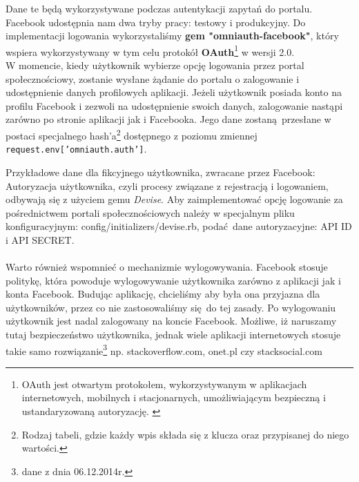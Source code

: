 Dane te będą wykorzystywane podczas autentykacji zapytań do portalu. Facebook udostępnia nam dwa tryby pracy: testowy i produkcyjny. Do implementacji logowania wykorzystaliśmy \textbf{gem "omniauth-facebook"}, który wspiera wykorzystywany w tym celu protokół \textbf{OAuth}\footnote{OAuth jest otwartym protokołem, wykorzystywanym w aplikacjach internetowych, mobilnych i stacjonarnych, umożliwiającym bezpieczną i ustandaryzowaną autoryzację. \cite{oauth}} w  wersji 2.0.
\\

W momencie, kiedy użytkownik wybierze opcję logowania przez portal społecznościowy, zostanie wysłane żądanie do portalu o zalogowanie i udostępnienie danych profilowych aplikacji. Jeżeli użytkownik posiada konto na profilu Facebook i zezwoli na udostępnienie swoich danych, zalogowanie nastąpi zarówno po stronie aplikacji jak i Facebooka. Jego dane zostaną przesłane w postaci specjalnego hash'a\footnote{Rodzaj tabeli, gdzie każdy wpis składa się z klucza oraz przypisanej do niego wartości.} dostępnego z poziomu zmiennej \texttt{request.env['omniauth.auth']}.

\clearpage

Przykładowe dane dla fikcyjnego użytkownika, zwracane przez Facebook:\\


\clearpage
Autoryzacja użytkownika, czyli procesy związane z rejestracją i logowaniem, odbywają się z użyciem gemu \emph{Devise}. Aby zaimplementować opcję logowanie za pośrednictwem portali społecznościowych należy w specjalnym pliku konfiguracyjnym: config/initializers/devise.rb, podać dane autoryzacyjne: API ID i API SECRET.\\

 \\

Warto również wspomnieć o mechanizmie wylogowywania. Facebook stosuje politykę, która powoduje wylogowywanie użytkownika zarówno z aplikacji jak i konta Facebook. Budując aplikację, chcieliśmy aby była ona przyjazna dla użytkowników, przez co nie zastosowaliśmy się do tej zasady. Po wylogowaniu użytkownik jest nadal zalogowany na koncie Facebook. Możliwe, iż naruszamy tutaj bezpieczeństwo użytkownika, jednak wiele aplikacji internetowych stosuje takie samo rozwiązanie\footnote{dane z dnia 06.12.2014r.} np. stackoverflow.com, onet.pl czy stacksocial.com
